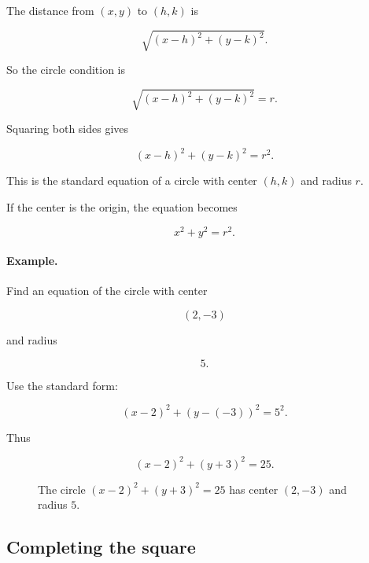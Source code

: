 The distance from \((x,y)\) to \((h,k)\) is

\[
\sqrt{(x-h)^2+(y-k)^2}.
\]

So the circle condition is

\[
\sqrt{(x-h)^2+(y-k)^2}=r.
\]

Squaring both sides gives

\[
\boxed{
(x-h)^2+(y-k)^2=r^2.
}
\]

This is the standard equation of a circle with center \((h,k)\) and radius \(r\).

If the center is the origin, the equation becomes

\[
\boxed{
x^2+y^2=r^2.
}
\]

\paragraph{Example.}
Find an equation of the circle with center

\[
(2,-3)
\]

and radius

\[
5.
\]

Use the standard form:

\[
(x-2)^2+(y-(-3))^2=5^2.
\]

Thus

\[
\boxed{
(x-2)^2+(y+3)^2=25.
}
\]

\begin{figure}[h]
\centering
{}
\caption{The circle \((x-2)^2+(y+3)^2=25\) has center \((2,-3)\) and radius \(5\).}
\label{fig:appendix-circle-center-radius}
\end{figure}

\subsection{Completing the square}
\label{appsubsec:circle-completing-square}

